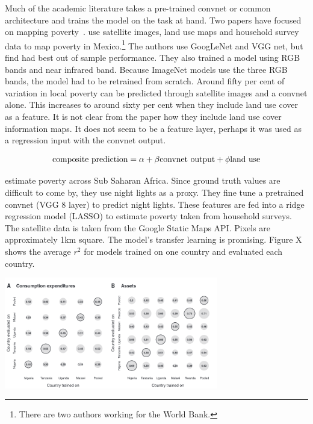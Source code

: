 \documentclass[12pt, a4paper, oneside, headinclude, footinclude]{article}
\begin{document}
Much of the academic literature takes a pre-trained convnet or common
architecture and trains the model on the task at hand. Two papers have focused
on mapping poverty~\cite{babenko2017poverty,Jean79}. \cite{babenko2017poverty}
use satellite images, land use maps and household survey data to map
poverty in Mexico.\footnote{There are two authors working for the World Bank.}
The authors use GoogLeNet and VGG net, but find had best out of sample
performance. They also trained a model using RGB bands and near infrared band.
Because ImageNet models use the three RGB bands, the model had to be retrained
from scratch.  Around fifty per cent of variation in local poverty can be
predicted through satellite images and a convnet alone. This increases to
around sixty per cent when they include land use cover as a feature. It
is not clear from the paper how they include land use cover information
maps. It does not seem to be a feature layer, perhaps it was used as a
regression input with the convnet output.

\begin{equation}
\textup{composite prediction} = \alpha + \beta\textup{convnet output} + \phi\textup{land use}
\end{equation}

\cite{Jean79} estimate poverty across Sub Saharan Africa. Since ground truth
values are difficult to come by, they use night lights as a proxy. They fine
tune a pretrained convnet (VGG 8 layer) to predict night lights. These
features are fed into a ridge regression model (LASSO) to estimate poverty
taken from household surveys. The satellite data is taken from the Google
Static Maps API. Pixels are approximately 1km square. The model's transfer
learning is promising. Figure X shows the average $r^2$ for models trained on
one country and evaluated each country.

\includegraphics[width=0.7\textwidth]{transfer-learning-poverty.png}
\end{document}

